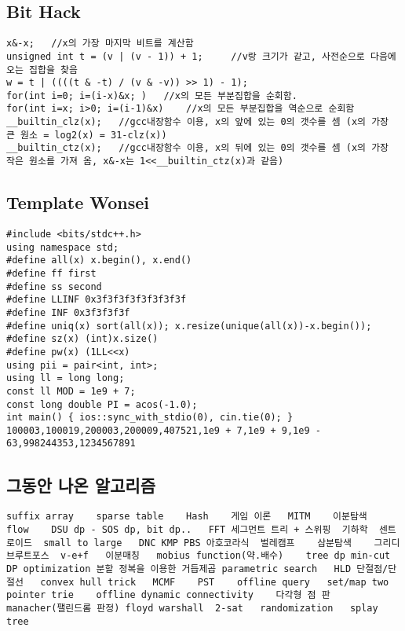 \documentclass[landscape, 8pt, a4paper, oneside, twocolumn]{extarticle}
\begin{document}
\subsection{Bit Hack}
\begin{verbatim}
x&-x;   //x의 가장 마지막 비트를 계산함
unsigned int t = (v | (v - 1)) + 1;     //v랑 크기가 같고, 사전순으로 다음에 오는 집합을 찾음
w = t | ((((t & -t) / (v & -v)) >> 1) - 1); 
for(int i=0; i=(i-x)&x; )   //x의 모든 부분집합을 순회함.
for(int i=x; i>0; i=(i-1)&x)    //x의 모든 부분집합을 역순으로 순회함
__builtin_clz(x);   //gcc내장함수 이용, x의 앞에 있는 0의 갯수를 셈 (x의 가장 큰 원소 = log2(x) = 31-clz(x))
__builtin_ctz(x);   //gcc내장함수 이용, x의 뒤에 있는 0의 갯수를 셈 (x의 가장 작은 원소를 가져 옴, x&-x는 1<<__builtin_ctz(x)과 같음)
\end{verbatim}
\subsection{Template Wonsei}
\begin{verbatim}
#include <bits/stdc++.h>
using namespace std;
#define all(x) x.begin(), x.end()
#define ff first
#define ss second
#define LLINF 0x3f3f3f3f3f3f3f3f
#define INF 0x3f3f3f3f
#define uniq(x) sort(all(x)); x.resize(unique(all(x))-x.begin());
#define sz(x) (int)x.size()
#define pw(x) (1LL<<x)
using pii = pair<int, int>;
using ll = long long;
const ll MOD = 1e9 + 7;
const long double PI = acos(-1.0);
int main() { ios::sync_with_stdio(0), cin.tie(0); }
100003,100019,200003,200009,407521,1e9 + 7,1e9 + 9,1e9 - 63,998244353,1234567891
\end{verbatim}
\subsection{그동안 나온 알고리즘}
\begin{verbatim}
suffix array    sparse table    Hash    게임 이론   MITM    이분탐색    flow    DSU dp - SOS dp, bit dp..   FFT 세그먼트 트리 + 스위핑  기하학  센트로이드  small to large   DNC KMP PBS 아호코라식  벌레캠프    삼분탐색    그리디  브루트포스  v-e+f   이분매칭   mobius function(약.배수)    tree dp min-cut DP optimization 분할 정복을 이용한 거듭제곱 parametric search   HLD 단절점/단절선   convex hull trick   MCMF    PST    offline query   set/map two pointer trie    offline dynamic connectivity    다각형 점 판   manacher(팰린드롬 판정) floyd warshall  2-sat   randomization   splay tree
\end{verbatim}
\label{LastPage}
\end{document}
